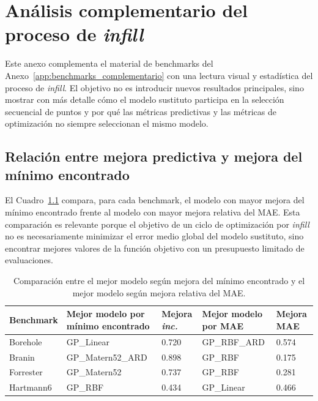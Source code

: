 \chapter{Análisis complementario del proceso de \emph{infill}}
\label{app:visualizacion_infill}

Este anexo complementa el material de benchmarks del Anexo~\ref{app:benchmarks_complementario} con una lectura visual y estadística del proceso de \emph{infill}. El objetivo no es introducir nuevos resultados principales, sino mostrar con más detalle cómo el modelo sustituto participa en la selección secuencial de puntos y por qué las métricas predictivas y las métricas de optimización no siempre seleccionan el mismo modelo.

\section{Relación entre mejora predictiva y mejora del mínimo encontrado}
\label{app:relacion_mae_incumbent}

El Cuadro~\ref{tab:app_modelos_incumbent_mae} compara, para cada benchmark, el modelo con mayor mejora del mínimo encontrado frente al modelo con mayor mejora relativa del MAE. Esta comparación es relevante porque el objetivo de un ciclo de optimización por \emph{infill} no es necesariamente minimizar el error medio global del modelo sustituto, sino encontrar mejores valores de la función objetivo con un presupuesto limitado de evaluaciones.

\begin{table}[htbp]
\centering
\small
\caption[Mejora del incumbent frente a mejora del MAE]{Comparación entre el mejor modelo según mejora del mínimo encontrado y el mejor modelo según mejora relativa del MAE.}
\label{tab:app_modelos_incumbent_mae}
\renewcommand{\arraystretch}{1.15}
\begin{tabularx}{\textwidth}{@{}p{2.4cm} p{3.0cm} p{2.0cm} p{3.0cm} p{2.0cm}@{}}
\toprule
\textbf{Benchmark} & \textbf{Mejor modelo por mínimo encontrado} & \textbf{Mejora \emph{inc.}} & \textbf{Mejor modelo por MAE} & \textbf{Mejora MAE} \\
\midrule
Borehole & GP\_Linear & 0.720 & GP\_RBF\_ARD & 0.574 \\
Branin & GP\_Matern52\_ARD & 0.898 & GP\_RBF & 0.175 \\
Forrester & GP\_Matern52 & 0.737 & GP\_RBF & 0.281 \\
Hartmann6 & GP\_RBF & 0.434 & GP\_Linear & 0.466 \\
\bottomrule
\end{tabularx}
\end{table}
\FloatBarrier

